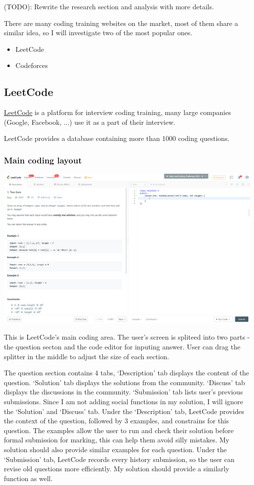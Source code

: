 \documentclass[a4paper]{report}
\begin{document}
 (TODO): Rewrite the research section and analysis with more details.

There are many coding training websites on the market, most of them share a similar idea, so I will investigate two of the most popular ones.

\begin{itemize}
    \item LeetCode
    \item Codeforces
\end{itemize}

\subsection{LeetCode}

\href{https://leetcode.com/}{LeetCode} is a platform for interview coding training, many large companies (Google, Facebook, ...) use it as a part of their interview.

LeetCode provides a database containing more than 1000 coding questions.

\subsubsection{Main coding layout}
\includegraphics[width=\linewidth]{Two-Sum-LeetCode-Coding}

This is LeetCode's main coding area. The user's screen is spliteed into two parts - the question secton and the code editor for inputing answer. User can drag the splitter in the middle to adjust the size of each section.

The question section contains 4 tabs, `Description' tab displays the content of the question. `Solution' tab displays the solutions from the community. `Discuss' tab displays the discussions in the community. `Submission' tab lists user's previous submissions. Since I am not adding social functions in my solution, I will ignore the `Solution' and `Discuss' tab. Under the `Description' tab, LeetCode provides the context of the question, followed by 3 examples, and constrains for this question. The examples allow the user to run and check their solution before formal submission for marking, this can help them avoid silly mistakes. My solution should also provide similar examples for each question. Under the `Submission' tab, LeetCode records every history submission, so the user can revise old questions more efficiently. My solution should provide a similarly function as well.
\end{document}
